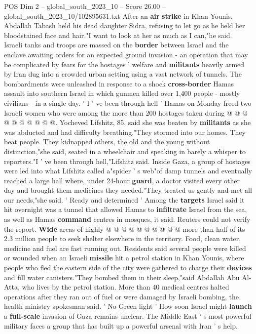 \begin{textsample}{POS Dim 2 – global\_south\_2023\_10 – Score 26.00 – global\_south\_2023\_10/102895631.txt}
After an \textbf{air} \textbf{strike} in Khan Younis, Abdallah Tabash held his dead daughter Sidra, refusing to let go as he held her bloodstained face and hair."I want to look at her as much as I can,"he said.
Israeli tanks and troops are massed on the \textbf{border} between Israel and the enclave awaiting orders for an expected ground invasion - an operation that may be complicated by fears for the hostages ' welfare and \textbf{militants} heavily armed by Iran dug into a crowded urban setting using a vast network of tunnels.
The bombardments were unleashed in response to a shock \textbf{cross-border} Hamas assault into southern Israel in which gunmen killed over 1,400 people - mostly civilians - in a single day. ' I ' ve been through hell ' Hamas on Monday freed two Israeli women who were among the more than 200 hostages taken during @ @ @ @ @ @ @ @ @ @.
Yocheved Lifshitz, 85, said she was beaten by \textbf{militants} as she was abducted and had difficulty breathing."They stormed into our homes.
They beat people.
They kidnapped others, the old and the young without distinction,"she said, seated in a wheelchair and speaking in barely a whisper to reporters."I ' ve been through hell,"Lifshitz said.
Inside Gaza, a group of hostages were led into what Lifshitz called a"spider ' s web"of damp tunnels and eventually reached a large hall where, under 24-hour \textbf{guard}, a doctor visited every other day and brought them medicines they needed."They treated us gently and met all our needs,"she said. ' Ready and determined ' Among the \textbf{targets} Israel said it hit overnight was a tunnel that allowed Hamas to \textbf{infiltrate} Israel from the sea, as well as Hamas \textbf{command} centres in mosques, it said.
Reuters could not verify the report. \textbf{Wide} areas of highly @ @ @ @ @ @ @ @ @ @ more than half of its 2.3 million people to seek shelter elsewhere in the territory.
Food, clean water, medicine and fuel are fast running out.
Residents said several people were killed or wounded when an Israeli \textbf{missile} hit a petrol station in Khan Younis, where people who fled the eastern side of the city were gathered to charge their \textbf{devices} and fill water canisters."They bombed them in their sleep,"said Abdallah Abu Al-Atta, who lives by the petrol station.
More than 40 medical centres halted operations after they ran out of fuel or were damaged by Israeli bombing, the health ministry spokesman said. ' No Green light ' How soon Israel might \textbf{launch} a \textbf{full-scale} invasion of Gaza remains unclear.
The Middle East ' s most powerful military faces a group that has built up a powerful arsenal with Iran ' s help.

\end{textsample}
